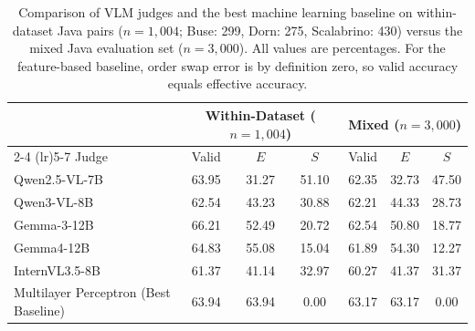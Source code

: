 \begin{table}[t]
\centering
\caption{Comparison of VLM judges and the best machine learning baseline on within-dataset Java pairs ($n=1,004$; Buse: 299, Dorn: 275, Scalabrino: 430) versus the mixed Java evaluation set ($n=3,000$). All values are percentages. For the feature-based baseline, order swap error is by definition zero, so valid accuracy equals effective accuracy.}
\label{tab:vlm_tab_java_within}
\small
\begin{tabular}{lcccccc}
\toprule
& \multicolumn{3}{c}{Within-Dataset ($n=1,004$)} & \multicolumn{3}{c}{Mixed ($n=3,000$)} \\
\cmidrule(lr){2-4} \cmidrule(lr){5-7}
Judge & Valid & $E$ & $S$ & Valid & $E$ & $S$ \\
\midrule
Qwen2.5-VL-7B & 63.95 & 31.27 & 51.10 & 62.35 & 32.73 & 47.50 \\
Qwen3-VL-8B & 62.54 & 43.23 & 30.88 & 62.21 & 44.33 & 28.73 \\
Gemma-3-12B & 66.21 & 52.49 & 20.72 & 62.54 & 50.80 & 18.77 \\
Gemma4-12B & 64.83 & 55.08 & 15.04 & 61.89 & 54.30 & 12.27 \\
InternVL3.5-8B & 61.37 & 41.14 & 32.97 & 60.27 & 41.37 & 31.37 \\
\midrule
Multilayer Perceptron (Best Baseline) & 63.94 & 63.94 & 0.00 & 63.17 & 63.17 & 0.00 \\
\bottomrule
\end{tabular}
\end{table}
